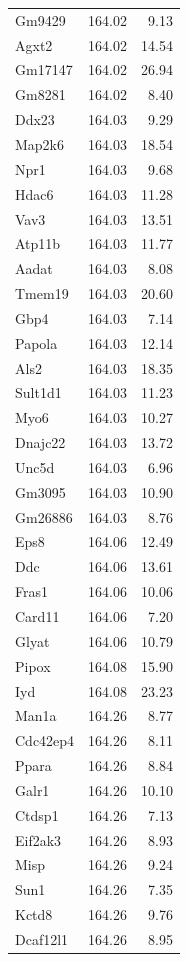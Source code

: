 \documentclass{article}
\begin{document}
\begin{longtable}{lrr}
  Gm9429 & 164.02 & 9.13 \\ 
  Agxt2 & 164.02 & 14.54 \\ 
  Gm17147 & 164.02 & 26.94 \\ 
  Gm8281 & 164.02 & 8.40 \\ 
  Ddx23 & 164.03 & 9.29 \\ 
  Map2k6 & 164.03 & 18.54 \\ 
  Npr1 & 164.03 & 9.68 \\ 
  Hdac6 & 164.03 & 11.28 \\ 
  Vav3 & 164.03 & 13.51 \\ 
  Atp11b & 164.03 & 11.77 \\ 
  Aadat & 164.03 & 8.08 \\ 
  Tmem19 & 164.03 & 20.60 \\ 
  Gbp4 & 164.03 & 7.14 \\ 
  Papola & 164.03 & 12.14 \\ 
  Als2 & 164.03 & 18.35 \\ 
  Sult1d1 & 164.03 & 11.23 \\ 
  Myo6 & 164.03 & 10.27 \\ 
  Dnajc22 & 164.03 & 13.72 \\ 
  Unc5d & 164.03 & 6.96 \\ 
  Gm3095 & 164.03 & 10.90 \\ 
  Gm26886 & 164.03 & 8.76 \\ 
  Eps8 & 164.06 & 12.49 \\ 
  Ddc & 164.06 & 13.61 \\ 
  Fras1 & 164.06 & 10.06 \\ 
  Card11 & 164.06 & 7.20 \\ 
  Glyat & 164.06 & 10.79 \\ 
  Pipox & 164.08 & 15.90 \\ 
  Iyd & 164.08 & 23.23 \\ 
  Man1a & 164.26 & 8.77 \\ 
  Cdc42ep4 & 164.26 & 8.11 \\ 
  Ppara & 164.26 & 8.84 \\ 
  Galr1 & 164.26 & 10.10 \\ 
  Ctdsp1 & 164.26 & 7.13 \\ 
  Eif2ak3 & 164.26 & 8.93 \\ 
  Misp & 164.26 & 9.24 \\ 
  Sun1 & 164.26 & 7.35 \\ 
  Kctd8 & 164.26 & 9.76 \\ 
  Dcaf12l1 & 164.26 & 8.95 \\ 

\end{longtable}
\end{document}
